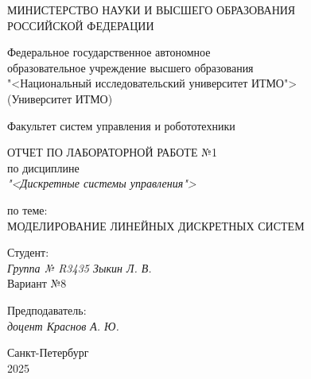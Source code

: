 \thispagestyle{empty}

\begin{center}
    МИНИСТЕРСТВО НАУКИ И ВЫСШЕГО ОБРАЗОВАНИЯ \\ РОССИЙСКОЙ ФЕДЕРАЦИИ

    \vspace{20pt}

    Федеральное государственное автономное \\ образовательное учреждение высшего образования \\
    "<Национальный исследовательский университет ИТМО"> \\
    (Университет ИТМО)

    \vspace{20pt}

    Факультет систем управления и робототехники
\end{center}

\vfill

\begin{center}
    ОТЧЕТ ПО ЛАБОРАТОРНОЙ РАБОТЕ №1\\  
    по дисциплине \\
    \textit{"<Дискретные системы управления">}

    \vspace{20pt}

    по теме: \\
    \uppercase{Моделирование линейных дискретных систем}
\end{center}

\vfill

    \noindent Студент: \\
    \textit{Группа № R3435 \hfill Зыкин Л. В.} \\
    \noindent Вариант №8 \\
    \vspace{20pt}

    \noindent Предподаватель: \\
    \textit{доцент \hfill Краснов А. Ю.}

\vfill

\begin{center}
    Санкт-Петербург \\ 2025
\end{center}